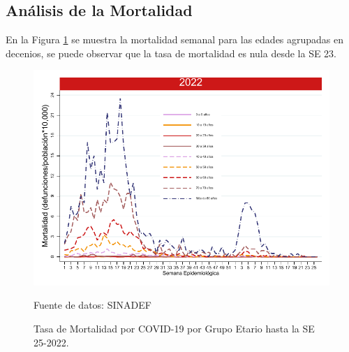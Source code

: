 \documentclass[12pt,a4paper,openany]{book}
\begin{document}
	\clearpage
	
	\subsection*{Análisis de la Mortalidad}
	
	\noindent En la Figura \ref{fig:mortalidad_edad} se muestra la mortalidad semanal para las edades agrupadas en decenios, se puede observar que la tasa de mortalidad es nula desde la SE 23.
	
	\begin{figure}[h]
		\caption{Tasa de Mortalidad por COVID-19 por Grupo Etario hasta la SE 25-2022.}\label{fig:mortalidad_edad}
		\begin{center}
			\includegraphics[width=0.65\linewidth]{../figuras/mortalidad_edad_2021_2022.pdf}
		\end{center}
		{\footnotesize Fuente de datos: SINADEF} 
	\end{figure}
	
\end{document}
